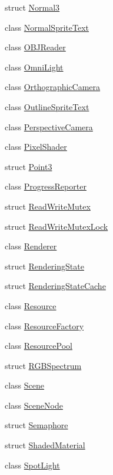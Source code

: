 \begin{DoxyCompactItemize}
\item 
struct \hyperlink{structmage_1_1_normal3}{Normal3}
\item 
class \hyperlink{classmage_1_1_normal_sprite_text}{Normal\+Sprite\+Text}
\item 
class \hyperlink{classmage_1_1_o_b_j_reader}{O\+B\+J\+Reader}
\item 
class \hyperlink{classmage_1_1_omni_light}{Omni\+Light}
\item 
class \hyperlink{classmage_1_1_orthographic_camera}{Orthographic\+Camera}
\item 
class \hyperlink{classmage_1_1_outline_sprite_text}{Outline\+Sprite\+Text}
\item 
class \hyperlink{classmage_1_1_perspective_camera}{Perspective\+Camera}
\item 
class \hyperlink{classmage_1_1_pixel_shader}{Pixel\+Shader}
\item 
struct \hyperlink{structmage_1_1_point3}{Point3}
\item 
class \hyperlink{classmage_1_1_progress_reporter}{Progress\+Reporter}
\item 
struct \hyperlink{structmage_1_1_read_write_mutex}{Read\+Write\+Mutex}
\item 
struct \hyperlink{structmage_1_1_read_write_mutex_lock}{Read\+Write\+Mutex\+Lock}
\item 
class \hyperlink{classmage_1_1_renderer}{Renderer}
\item 
struct \hyperlink{structmage_1_1_rendering_state}{Rendering\+State}
\item 
struct \hyperlink{structmage_1_1_rendering_state_cache}{Rendering\+State\+Cache}
\item 
class \hyperlink{classmage_1_1_resource}{Resource}
\item 
class \hyperlink{classmage_1_1_resource_factory}{Resource\+Factory}
\item 
class \hyperlink{classmage_1_1_resource_pool}{Resource\+Pool}
\item 
struct \hyperlink{structmage_1_1_r_g_b_spectrum}{R\+G\+B\+Spectrum}
\item 
class \hyperlink{classmage_1_1_scene}{Scene}
\item 
class \hyperlink{classmage_1_1_scene_node}{Scene\+Node}
\item 
struct \hyperlink{structmage_1_1_semaphore}{Semaphore}
\item 
struct \hyperlink{structmage_1_1_shaded_material}{Shaded\+Material}
\item 
class \hyperlink{classmage_1_1_spot_light}{Spot\+Light}

\end{DoxyCompactItemize}
